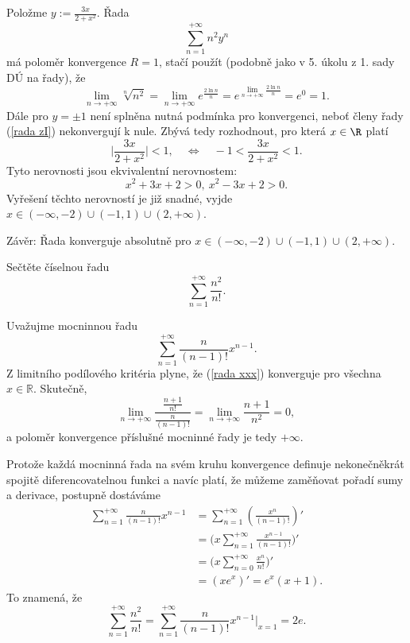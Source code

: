 \documentclass[answers]{exam}
\begin{document}
\begin{questions}
  \begin{solution}
		Polo\v zme $y:=\frac{3x}{2+x^2}$. \v Rada
		\begin{equation}\label{rada zI}
		\sum_{n=1}^{+\infty}n^2 y^n 
		\end{equation}
		m\'a polom\v er konvergence $R=1$, sta\v c\'i pou\v z\'it (podobn\v e jako v 5. \'ukolu z 1. sady D\'U na \v rady), \v ze 
		\begin{equation}\label{lim}
		\lim_{n\to+\infty}\sqrt[n]{n^2}=\lim_{n\to+\infty}e^{\frac{2\ln n}{n}}=e^{\lim_{n\to+\infty}\frac{2\ln n}{n}}=e^0=1. 
		\end{equation}
		D\'ale pro $y=\pm1$ nen\'i spln\v ena nutn\'a podm\'inka pro konvergenci, nebo\v t \v cleny \v rady (\ref{rada zI}) nekonverguj\'i k nule. Zb\'yv\'a tedy rozhodnout, pro kter\'a $x \in \R$ plat\'i
		$$\bigg|\frac{3x}{2+x^2}\bigg|<1,
		\quad
		\iff
		\quad -1<\frac{3x}{2+x^2}<1.$$
		Tyto nerovnosti jsou ekvivalentn\'i nerovnostem:
		$$x^2+3x+2>0,\ x^2-3x+2>0.$$
		Vy\v re\v sen\'i t\v echto nerovnost\'i je ji\v z snadn\'e, vyjde $x\in(-\infty,-2)\cup(-1,1)\cup(2,+\infty)$.  
		
		Závěr: Řada konverguje absolutně pro $x\in(-\infty,-2)\cup(-1,1)\cup(2,+\infty)$.
  \end{solution}
  
  \question
  Sečtěte číselnou řadu
  \begin{equation*}
    \sum_{n = 1}^{+\infty}
		\frac{n^2}{n!}.
  \end{equation*}
  
  \begin{solution}
		Uva\v zujme mocninnou \v radu
		\begin{equation}\label{rada xxx}
		\sum_{n=1}^{+\infty}\frac{n}{(n-1)!}x^{n-1}. 
		\end{equation}
		Z limitn\'iho pod\'ilov\'eho krit\'eria plyne, \v ze (\ref{rada xxx}) konverguje pro v\v sechna $x\in\mathbb R$. Skute\v cn\v e,
		$$\lim_{n\to+\infty}\frac{\frac{n+1}{n!}}{\frac{n}{(n-1)!}}=\lim_{n\to+\infty}\frac{n+1}{n^2}=0,$$
		a poloměr konvergence příslušné mocninné řady je tedy $+\infty$.
		
		Protože každá mocninná řada na svém kruhu konvergence definuje nekonečněkrát spojitě diferencovatelnou funkci a navíc platí, že můžeme zaměňovat pořadí sumy a derivace, postupně dostáváme
		\begin{align*}
		\sum_{n=1}^{+\infty}\frac{n}{(n-1)!}x^{n-1}&=\sum_{n=1}^{+\infty}\left(\frac{x^{n}}{(n-1)!}\right)'\\
		&=\bigg( x\sum_{n=1}^{+\infty}\frac{x^{n-1}}{(n-1)!}\bigg)'\\
		&=\bigg( x\sum_{n=0}^{+\infty}\frac{x^{n}}{n!}\bigg)'\\
		&=(xe^x)'=e^x(x+1).
		\end{align*}
		To znamen\'a, \v ze 
		$$\sum_{n=1}^{+\infty}\frac{n^2}{n!}=\sum_{n=1}^{+\infty}\frac{n}{(n-1)!}x^{n-1}\bigg|_{x=1}=2e.$$  	
  \end{solution}
  

\end{questions}
\end{document}
